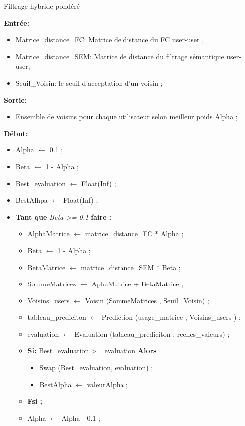  \begin{algorithm}[H]
	\caption{Filtrage hybride pondéré}\label{HP}
	\hspace*{\algorithmicindent} \textbf{Entrée:}
	 \begin{itemize}
	\item [] Matrice{\_}distance{\_}FC: Matrice de distance du FC user-user , 
	\item [] Matrice{\_}distance{\_}SEM: Matrice de distance du filtrage sémantique user-user,
	\item [] Seuil{\_}Voisin: le seuil d'acceptation d'un voisin ;
	\end{itemize}
	\hspace*{\algorithmicindent} \textbf{Sortie:} 
	\begin{itemize}
	\item [] Ensemble de voisins pour chaque utilisateur selon meilleur poids Alpha ; 
	
	
	\end{itemize}
	
	\hspace*{\algorithmicindent}\textbf{ Début:}
	\begin{itemize}
		
		\item [] Alpha $\leftarrow$ 0.1 ;
		\item [] Beta $\leftarrow$ 1 - Alpha ;
		\item [] Best{\_}evaluation $\leftarrow$ Float(Inf) ;
		\item [] BestAlhpa $\leftarrow$ Float(Inf) ;
		\item []\textbf{Tant que } \textit{Beta >= 0.1}  \textbf{faire :} 
		\begin{itemize}
			
			\item [] AlphaMatrice $\leftarrow$  matrice{\_}distance{\_}FC * Alpha ;
			\item []Beta $\leftarrow$ 1 - Alpha ;
			\item [] BetaMatrice $\leftarrow$  matrice{\_}distance{\_}SEM * Beta ;
			\item  [] SommeMatrices $\leftarrow$  AphaMatrice +  BetaMatrice ;
			\item  [] Voisins{\_}users  $\leftarrow$ Voisin (SommeMatrices , Seuil{\_}Voisin) ;
			\item [] tableau{\_}prediciton $\leftarrow$  Prediction (usage{\_}matrice , Voisins{\_}users ) ;
			\item [] evaluation $\leftarrow$ Evaluation (tableau{\_}prediciton , reelles{\_}valeurs) ;
			\item [] \textbf{Si:} Best{\_}evaluation  >=  evaluation \textbf{Alors} 
			\begin{itemize}
				\item [] 	Swap (Best{\_}evaluation, evaluation) ;
				\item [] 	BestAlpha $\leftarrow$ valeurAlpha ;
			\end{itemize}	
				\item [] \textbf{Fsi ;}
				\item [] Alpha $\leftarrow$ Alpha - 0.1 ;
					

\end{itemize}
\end{itemize}
\end{algorithm}
